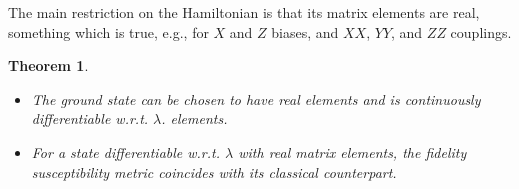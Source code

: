 \documentclass[american,aps,pra,reprint,floatfix,nofootinbib,superscriptaddress]{revtex4-2}
\newtheorem{theorem}{Theorem}
\begin{document}
The main restriction on the Hamiltonian is that its matrix elements are
real, something which is true, e.g., for $X$ and $Z$ biases,
and $XX$, $YY$, and $ZZ$ couplings.
\begin{theorem}
  \label{th:comput.basis}
  \begin{itemize}
    Consider a continuously differentiable Hamiltonian $H(\lambda)$ acting on a
      finite-dimensional Hilbert space $\mathcal{H}$. Assume that matrix elements of the
      Hamiltonian are real in a particular basis which we
      will call the ``computational basis''. Also assume that the ground state of
      this Hamiltonian is non-degenerate. Then:
      \item The ground state can be chosen to have real elements and is
      continuously differentiable w.r.t. $\lambda$.
      elements.
    \item For a state differentiable w.r.t. $\lambda$ with real matrix elements, the
      fidelity susceptibility metric coincides with its classical counterpart.
  \end{itemize}
\end{theorem}
\end{document}
